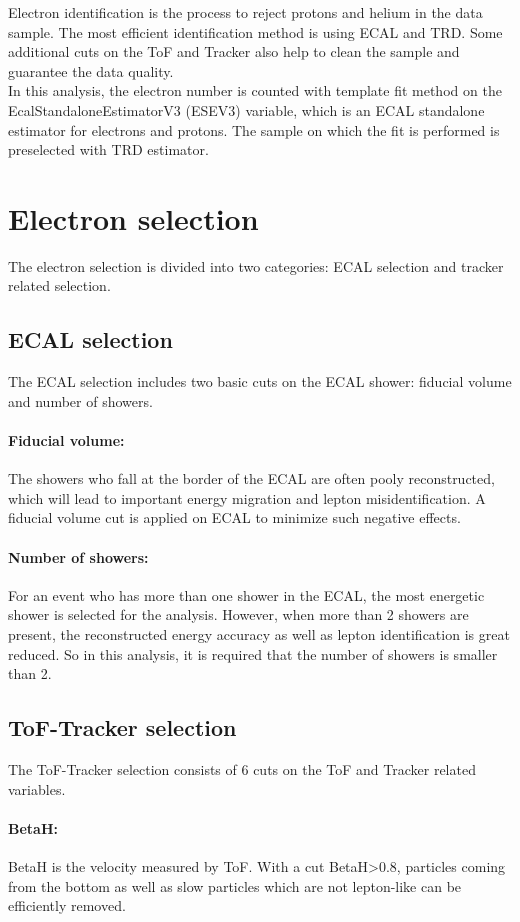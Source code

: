 
Electron identification is the process to reject protons and helium in the data sample. The most efficient identification method is using ECAL and TRD. Some additional cuts on the ToF and Tracker also help to clean the sample and guarantee the data quality.\\
In this analysis, the electron number is counted with template fit method on the EcalStandaloneEstimatorV3 (ESEV3) variable, which is an ECAL standalone estimator for electrons and protons. The sample on which the fit is performed is preselected with TRD estimator.

\section{Electron selection}
The electron selection is divided into two categories: ECAL selection and tracker related selection.
\subsection{ECAL selection}
The ECAL selection includes two basic cuts on the ECAL shower: fiducial volume and number of showers.
\paragraph{Fiducial volume:} The showers who fall at the border of the ECAL are often pooly reconstructed, which will lead to important energy migration and lepton misidentification. A fiducial volume cut is applied on ECAL to minimize such negative effects.
\paragraph{Number of showers:} For an event who has more than one shower in the ECAL, the most energetic shower is selected for the analysis. However, when more than 2 showers are present, the reconstructed energy accuracy as well as lepton identification is great reduced. So in this analysis, it is required that the number of showers is smaller than 2.
\subsection{ToF-Tracker selection}
The ToF-Tracker selection consists of 6 cuts on the ToF and Tracker related variables.
\paragraph{BetaH:} BetaH is the velocity measured by ToF. With a cut BetaH>0.8, particles coming from the bottom as well as slow particles which are not lepton-like can be efficiently removed.
